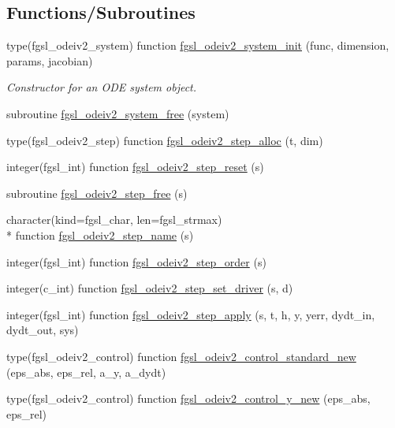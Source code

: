 \subsection*{Functions/\-Subroutines}
\begin{DoxyCompactItemize}
\item 
type(fgsl\-\_\-odeiv2\-\_\-system) function \hyperlink{ode_8finc_a2ffec24e60a38bee53c48aa9c9e3c1b7}{fgsl\-\_\-odeiv2\-\_\-system\-\_\-init} (func, dimension, params, jacobian)
\begin{DoxyCompactList}\small\item\em Constructor for an O\-D\-E system object. \end{DoxyCompactList}\item 
subroutine \hyperlink{ode_8finc_ab973a74e019e0e361f76db2a15b1ce5d}{fgsl\-\_\-odeiv2\-\_\-system\-\_\-free} (system)
\item 
type(fgsl\-\_\-odeiv2\-\_\-step) function \hyperlink{ode_8finc_a38ccf460c6a701df582e42b350fd9eaf}{fgsl\-\_\-odeiv2\-\_\-step\-\_\-alloc} (t, dim)
\item 
integer(fgsl\-\_\-int) function \hyperlink{ode_8finc_a2e77e51cfb8862339548a89edb5b5f16}{fgsl\-\_\-odeiv2\-\_\-step\-\_\-reset} (s)
\item 
subroutine \hyperlink{ode_8finc_a5ba021a1cf3acf48a05c91f83fae1e92}{fgsl\-\_\-odeiv2\-\_\-step\-\_\-free} (s)
\item 
character(kind=fgsl\-\_\-char, len=fgsl\-\_\-strmax) \\*
function \hyperlink{ode_8finc_ae18d4d99a73710093fef3a8bd3501d4b}{fgsl\-\_\-odeiv2\-\_\-step\-\_\-name} (s)
\item 
integer(fgsl\-\_\-int) function \hyperlink{ode_8finc_ae49a399cca2cb8575c6a46ea337c477f}{fgsl\-\_\-odeiv2\-\_\-step\-\_\-order} (s)
\item 
integer(c\-\_\-int) function \hyperlink{ode_8finc_a1f1e1c96acf507d235684138e06ae697}{fgsl\-\_\-odeiv2\-\_\-step\-\_\-set\-\_\-driver} (s, d)
\item 
integer(fgsl\-\_\-int) function \hyperlink{ode_8finc_aa4c31f598649a9ba6853f97921387c80}{fgsl\-\_\-odeiv2\-\_\-step\-\_\-apply} (s, t, h, y, yerr, dydt\-\_\-in, dydt\-\_\-out, sys)
\item 
type(fgsl\-\_\-odeiv2\-\_\-control) function \hyperlink{ode_8finc_a1830985a3df6d1a333c80ba967e76eec}{fgsl\-\_\-odeiv2\-\_\-control\-\_\-standard\-\_\-new} (eps\-\_\-abs, eps\-\_\-rel, a\-\_\-y, a\-\_\-dydt)
\item 
type(fgsl\-\_\-odeiv2\-\_\-control) function \hyperlink{ode_8finc_aed35a989d1582ac1920fa082fad216d9}{fgsl\-\_\-odeiv2\-\_\-control\-\_\-y\-\_\-new} (eps\-\_\-abs, eps\-\_\-rel)

\end{DoxyCompactItemize}
